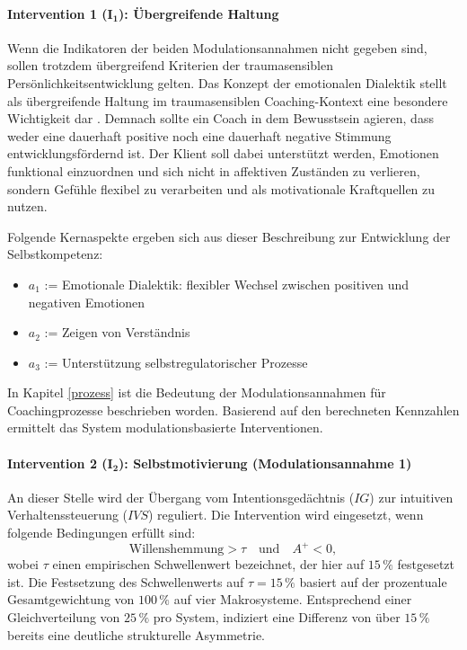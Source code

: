 \paragraph{Intervention 1 ($\boldsymbol{I_1}$): Übergreifende Haltung}
Wenn die Indikatoren der beiden Modulationsannahmen nicht gegeben sind, sollen trotzdem übergreifend Kriterien der traumasensiblen Persönlichkeitsentwicklung gelten.
Das Konzept der emotionalen Dialektik stellt als übergreifende Haltung im traumasensiblen Coaching-Kontext eine besondere Wichtigkeit dar \citep{kuhl2005neue}. Demnach sollte ein Coach in dem Bewusstsein agieren, dass weder eine dauerhaft positive noch eine dauerhaft negative Stimmung entwicklungsfördernd ist. Der Klient soll dabei unterstützt werden, Emotionen funktional einzuordnen und sich nicht in affektiven Zuständen zu verlieren, sondern Gefühle flexibel zu verarbeiten und als motivationale Kraftquellen zu nutzen. 

Folgende Kernaspekte ergeben sich aus dieser Beschreibung zur Entwicklung der Selbstkompetenz:
\begin{itemize}
    \item $a_1$ := Emotionale Dialektik: flexibler Wechsel zwischen positiven und negativen Emotionen
    \item $a_2$ := Zeigen von Verständnis
    \item $a_3$ := Unterstützung selbstregulatorischer Prozesse
   \end{itemize}

In Kapitel \ref{prozess} ist die Bedeutung der Modulationsannahmen für Coachingprozesse beschrieben worden. Basierend auf den berechneten Kennzahlen ermittelt das System modulationsbasierte Interventionen.


\paragraph{Intervention 2 ($\boldsymbol{I_2}$): Selbstmotivierung
(Modulationsannahme 1)}

An dieser Stelle wird der Übergang vom Intentionsgedächtnis
($IG$) zur intuitiven Verhaltenssteuerung ($IVS$) reguliert.
Die Intervention wird eingesetzt, wenn folgende Bedingungen
erfüllt sind:
\[
\text{Willenshemmung} > \tau
\quad \text{und} \quad A^+ < 0,
\]
wobei $\tau$ einen empirischen Schwellenwert bezeichnet, der hier auf $15\,\%$ festgesetzt ist.
Die Festsetzung des Schwellenwerts auf $\tau = 15\,\%$ basiert auf der prozentuale Gesamtgewichtung von $100\,\%$ auf vier Makrosysteme. Entsprechend einer Gleichverteilung von $25\,\%$ pro System, indiziert eine Differenz von über $15\,\%$ bereits eine deutliche strukturelle Asymmetrie.


